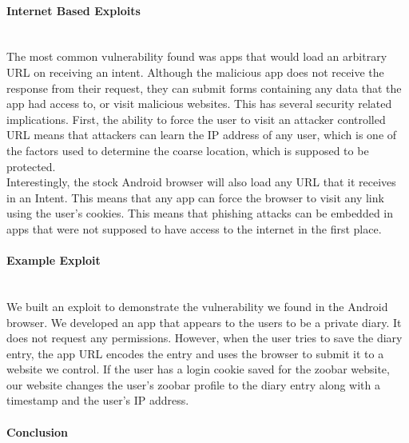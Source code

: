 \documentclass[12pt,a4paper]{article}
\begin{document}
\paragraph{Internet Based Exploits} ~\\ The most common vulnerability found was
apps that would load an arbitrary URL on receiving an intent. Although the
malicious app does not receive the response from their request, they can submit
forms containing any data that the app had access to, or visit malicious
websites. This has several security related implications. First, the ability to
force the user to visit an attacker controlled URL means that attackers can
learn the IP address of any user, which is one of the factors used to determine
the coarse location, which is supposed to be protected.  \\ Interestingly, the
stock Android browser will also load any URL that it receives in an Intent. This
means that any app can force the browser to visit any link using the user's
cookies. This means that phishing attacks can be embedded in apps that were not
supposed to have access to the internet in the first place.

\paragraph{Example Exploit} ~\\
We built an exploit to demonstrate the vulnerability we found in the Android browser. We developed an app that appears to the users to be a private diary. It does not request any permissions. However, when the user tries to save the diary entry, the app URL encodes the entry and uses the browser to submit it to a website we control. If the user has a login cookie saved for the zoobar website, our website changes the user's zoobar profile to the diary entry along with a timestamp and the user's IP address.

\paragraph{Conclusion} ~\\

 
\end{document}
